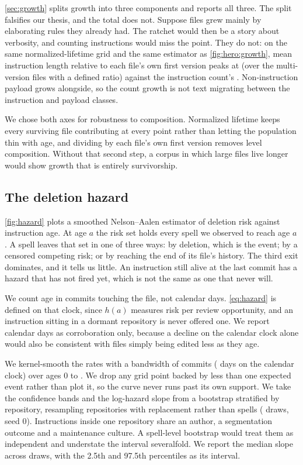 \autoref{sec:growth} splits growth into three components and reports all three. The split
falsifies our thesis, and the total does not. Suppose files grew mainly by elaborating rules they
already had. The ratchet would then be a story about verbosity, and counting instructions would
miss the point. They do not: on the same normalized-lifetime grid and the same estimator as
\autoref{fig:hero:growth}, mean instruction length relative to each file's own first version peaks
at \FieldGrowthLenPeakPct{} (over the \FieldGrowthLenFiles{} multi-version files with a defined
ratio) against the instruction count's \FieldGrowthCountPeakPct{}. Non-instruction payload grows
\FieldGrowthPayloadPct{} alongside, so the count growth is not text migrating between the
instruction and payload classes.

We chose both axes for robustness to composition. Normalized lifetime keeps every surviving file
contributing at every point rather than letting the population thin with age, and dividing by each
file's own first version removes level composition. Without that second step, a corpus in which
large files live longer would show growth that is entirely survivorship.

\subsection{The deletion hazard}
\label{sec:appendix:hazard}

\autoref{fig:hazard} plots a smoothed Nelson--Aalen estimator of deletion risk against instruction
age. At age $a$ the risk set holds every spell we observed to reach age $a$. A spell leaves that
set in one of three ways: by deletion, which is the event; by a censored competing risk; or by
reaching the end of its file's history. The third exit dominates, and it tells us little. An
instruction still alive at the last commit has a hazard that has not fired yet, which is not the
same as one that never will.

We count age in commits touching the file, not calendar days. \autoref{eq:hazard} is defined on
that clock, since $h(a)$ measures risk per review opportunity, and an instruction sitting in a
dormant repository is never offered one. We report calendar days as corroboration only, because a
decline on the calendar clock alone would also be consistent with files simply being edited less as
they age.

We kernel-smooth the rates with a bandwidth of \HazardBandwidthCommits{} commits
(\HazardBandwidthDays{} days on the calendar clock) over ages $0$ to \HazardAgeMax{}. We drop any
grid point backed by less than one expected event rather than plot it, so the curve never runs past
its own support. We take the confidence bands and the log-hazard slope from a bootstrap stratified
by repository, resampling repositories with replacement rather than spells (\HazardBoot{} draws,
seed 0). Instructions inside one repository share an author, a segmentation outcome and a
maintenance culture. A spell-level bootstrap would treat them as independent and understate the
interval severalfold. We report the median slope across draws, with the 2.5th and 97.5th
percentiles as its interval.

